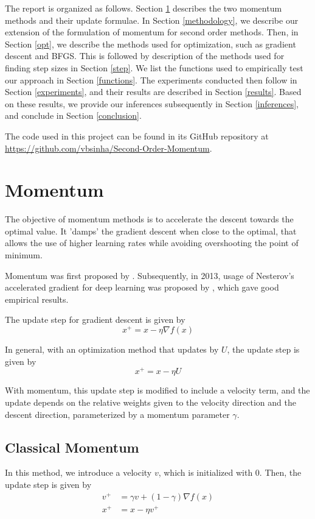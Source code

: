 \documentclass{article}
\begin{document}
The report is organized as follows. Section \ref{momentum} describes the two momentum methods and their update formulae. In Section \ref{methodology}, we describe our extension of the formulation of momentum for second order methods. Then, in Section \ref{opt}, we describe the methods used for optimization, such as gradient descent and BFGS. This is followed by description of the methods used for finding step sizes in Section \ref{step}. We list the functions used to empirically test our approach in Section \ref{functions}. The experiments conducted then follow in Section \ref{experiments}, and their results are described in Section \ref{results}. Based on these results, we provide our inferences subsequently in Section \ref{inferences}, and conclude in Section \ref{conclusion}.

The code used in this project can be found in its GitHub repository at \url{https://github.com/vbsinha/Second-Order-Momentum}.

\section{Momentum}\label{momentum}

The objective of momentum methods is to accelerate the descent towards the optimal value. It 'damps' the gradient descent when close to the optimal, that allows the use of higher learning rates while avoiding overshooting the point of minimum.

Momentum was first proposed by \citep{POLYAK19641}. Subsequently, in 2013, usage of Nesterov's accelerated gradient for deep learning was proposed by \citet{Sutskever}, which gave good empirical results.

The update step for gradient descent is given by
\begin{equation}
x^+ = x - \eta \nabla f(x)
\end{equation}

In general, with an optimization method that updates by $U$, the update step is given by
\begin{equation}
x^+ = x - \eta U
\end{equation}

With momentum, this update step is modified to include a velocity term, and the update depends on the relative weights given to the velocity direction and the descent direction, parameterized by a momentum parameter $\gamma$.

\subsection{Classical Momentum}
In this method, we introduce a velocity $v$, which is initialized with $0$. Then, the update step is given by
\begin{align}
v^+ &= \gamma v + (1-\gamma) \nabla f(x) \\
x^+ &= x - \eta v^+
\end{align}
\end{document}
